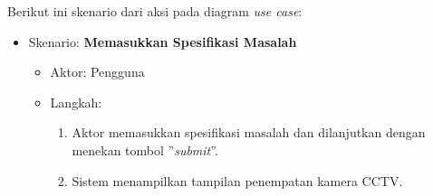 Berikut ini skenario dari aksi pada diagram \textit{use case}:
\begin{itemize}
	\item Skenario: \textbf{Memasukkan Spesifikasi Masalah}
	\begin{itemize}
		\item Aktor: Pengguna
		\item Langkah:
		\begin{enumerate}
			\item Aktor memasukkan spesifikasi masalah dan dilanjutkan dengan menekan tombol ''\textit{submit}''.
			\item Sistem menampilkan tampilan penempatan kamera CCTV.
		\end{enumerate}
	\end{itemize}

\end{itemize}
